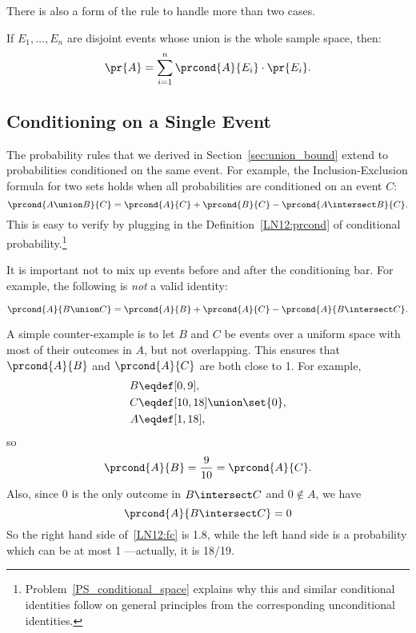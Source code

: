 There is also a form of the rule to handle more than two cases.
\begin{rul}
If $E_1, \dots, E_n$ are disjoint events whose union is the whole
sample space, then:
\[
\pr{A} = \sum_{i=1}^{n} \prcond{A}{E_i} \cdot \pr{E_i}.
\]
\end{rul}

\subsection{Conditioning on a Single Event}\label{cond_ident_subsec}

The probability rules that we derived in Section~\ref{sec:union_bound}
extend to probabilities conditioned on the same event.  For example,
the Inclusion-Exclusion formula for two sets holds when all
probabilities are conditioned on an event $C$:
\[
\prcond{A \union B}{C} = \prcond{A}{C} + \prcond{B}{C} - \prcond{A \intersect B}{C}.
\]
This is easy to verify by plugging in the Definition~\ref{LN12:prcond}
of conditional
probability.\footnote{Problem~\ref{PS_conditional_space} explains why
  this and similar conditional identities follow on general principles
  from the corresponding unconditional identities.}

\iffalse
This follows from the fact that if $\pr{C} \neq 0$, then
\begin{align*}
\prcond{A \union B}{C}
    &= \frac{\pr{(A \union B) \intersect C}}{\pr{C}} \\[3pt]
    &= \frac{\pr{(A \intersect C) \union (B \intersect C)}}{\pr{C}} \\[3pt]
    &= \frac{\pr{A \intersect C} + \pr{B \intersect C}
             - \pr{A \intersect B \intersect C}}
            {\pr{C}} \\[3pt]
    &= \prcond{A}{C} + \prcond{B}{C} - \prcond{A \intersect B}{C}.
\end{align*}
\fi

It is important not to mix up events before and after the conditioning
bar.  For example, the following is \emph{not} a valid identity:
%
\begin{falseclm*}
\begin{equation}\label{LN12:fc}
\prcond{A}{B \union C} = \prcond{A}{B} + \prcond{A}{C} - \prcond{A}{B \intersect C}.
\end{equation}
\end{falseclm*}

A simple counter-example is to let $B$ and $C$ be events over a
uniform space with most of their outcomes in $A$, but not overlapping.
This ensures that $\prcond{A}{B}$ and $\prcond{A}{C}$ are both close
to 1.  For example,
\begin{align*}
B & \eqdef [0,9],\\
C & \eqdef [10,18] \union \set{0},\\
A & \eqdef [1,18],
\end{align*}
so
\[
\prcond{A}{B} = \frac{9}{10} = \prcond{A}{C}.
\]
Also, since 0 is the only outcome in $B \intersect C$ and $0 \notin
A$, we have
\[
\prcond{A}{B \intersect C} = 0
\]
So the right hand side of~\eqref{LN12:fc} is 1.8, while the left hand
side is a probability which can be at most 1 ---actually, it is 18/19.

